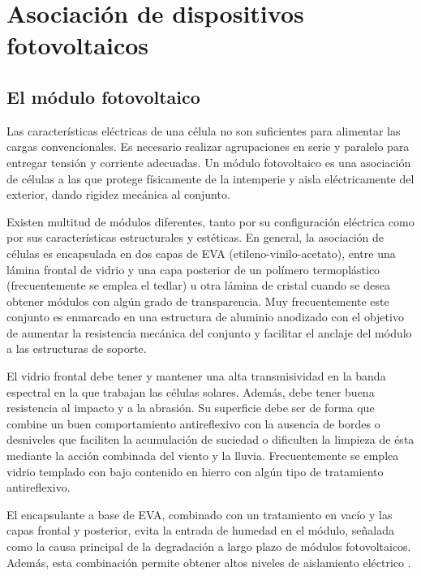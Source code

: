 
\chapter{Asociación de dispositivos fotovoltaicos\label{cha:AsociacionDispositivos}}


\section{El módulo fotovoltaico}

Las características eléctricas de una célula no son suficientes para
alimentar las cargas convencionales. Es necesario realizar agrupaciones
en serie y paralelo para entregar tensión y corriente adecuadas. Un
módulo fotovoltaico es una asociación de células a las que protege
físicamente de la intemperie y aisla eléctricamente del exterior,
dando rigidez mecánica al conjunto. 

Existen multitud de módulos diferentes, tanto por su configuración
eléctrica como por sus características estructurales y estéticas.
En general, la asociación de células es encapsulada en dos capas de
EVA (etileno-vinilo-acetato), entre una lámina frontal de vidrio y
una capa posterior de un polímero termoplástico (frecuentemente se
emplea el tedlar) u otra lámina de cristal cuando se desea obtener
módulos con algún grado de transparencia. Muy frecuentemente este
conjunto es enmarcado en una estructura de aluminio anodizado con
el objetivo de aumentar la resistencia mecánica del conjunto y facilitar
el anclaje del módulo a las estructuras de soporte.

El vidrio frontal debe tener y mantener una alta transmisividad en
la banda espectral en la que trabajan las células solares. Además,
debe tener buena resistencia al impacto y a la abrasión. Su superficie
debe ser de forma que combine un buen comportamiento antireflexivo
con la ausencia de bordes o desniveles que faciliten la acumulación
de suciedad o dificulten la limpieza de ésta mediante la acción combinada
del viento y la lluvia. Frecuentemente se emplea vidrio templado con
bajo contenido en hierro con algún tipo de tratamiento antireflexivo.

El encapsulante a base de EVA, combinado con un tratamiento en vacío
y las capas frontal y posterior, evita la entrada de humedad en el
módulo, señalada como la causa principal de la degradación a largo
plazo de módulos fotovoltaicos. Además, esta combinación permite obtener
altos niveles de aislamiento eléctrico \citep{Wenham.Green.ea2000}. 


